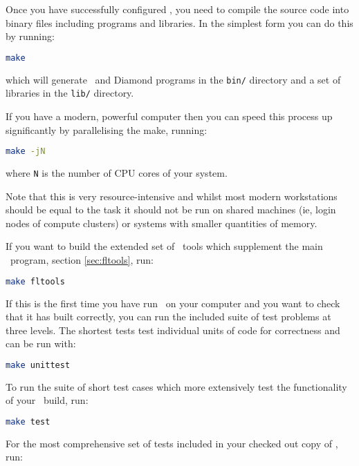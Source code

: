 Once you have successfully configured \fluidity, you need to compile the source
code into binary files including programs and libraries. In the simplest form
you can do this by running:

\begin{lstlisting}[language=Bash]
make
\end{lstlisting}

which will generate \fluidity\ and Diamond programs in the
\lstinline[language=Bash]+bin/+ directory and a set of libraries in the
\lstinline[language=Bash]+lib/+ directory. 

If you have a modern, powerful computer then you can speed this process up
significantly by parallelising the make, running:

\begin{lstlisting}[language=Bash]
make -jN
\end{lstlisting}
where \lstinline[language=Bash]+N+ is the number of CPU cores of your system.

Note that this is very resource-intensive and whilst most modern workstations
should be equal to the task it should not be run on shared machines (ie, login
nodes of compute clusters) or systems with smaller quantities of memory.

If you want to build the extended set of \fluidity\ tools which supplement the
main \fluidity\ program, section \ref{sec:fltools}, run:

\begin{lstlisting}[language=Bash]
make fltools
\end{lstlisting}

If this is the first time you have run \fluidity\ on your computer and you want
to check that it has built correctly, you can run the included suite of test
problems at three levels. The shortest tests test individual units of code for
correctness and can be run with:

\begin{lstlisting}[language=Bash]
make unittest
\end{lstlisting}

To run the suite of short test cases which more extensively test the
functionality of your \fluidity\ build, run:

\begin{lstlisting}[language=Bash]
make test
\end{lstlisting}

For the most comprehensive set of tests included in your checked out copy of
\fluidity, run:

